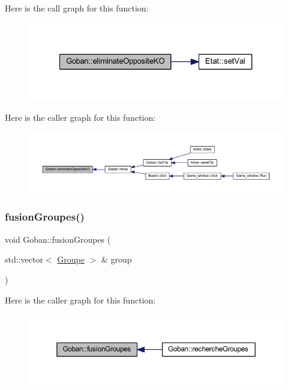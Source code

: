 Here is the call graph for this function\+:
\nopagebreak
\begin{figure}[H]
\begin{center}
\leavevmode
\includegraphics[width=327pt]{class_goban_a6c4b62a9469b3876d250ab94bcd562e5_cgraph}
\end{center}
\end{figure}
Here is the caller graph for this function\+:
\nopagebreak
\begin{figure}[H]
\begin{center}
\leavevmode
\includegraphics[width=350pt]{class_goban_a6c4b62a9469b3876d250ab94bcd562e5_icgraph}
\end{center}
\end{figure}
\mbox{\label{class_goban_abc771312b6931c4217285ee1b306e51b}} 
\subsubsection{\texorpdfstring{fusion\+Groupes()}{fusionGroupes()}}
{\footnotesize\ttfamily void Goban\+::fusion\+Groupes (\begin{DoxyParamCaption}\item[{std\+::vector$<$ \hyperlink{class_groupe}{Groupe} $>$ \&}]{group }\end{DoxyParamCaption})}

Here is the caller graph for this function\+:
\nopagebreak
\begin{figure}[H]
\begin{center}
\leavevmode
\includegraphics[width=350pt]{class_goban_abc771312b6931c4217285ee1b306e51b_icgraph}
\end{center}
\end{figure}
\mbox{\label{class_goban_a6b13aeeebc07fddc6a0e4557b90adc7d}} 
